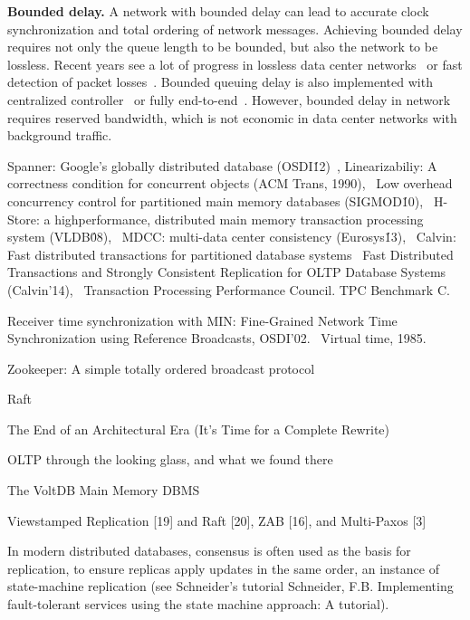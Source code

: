\textbf{Bounded delay.}
A network with bounded delay can lead to accurate clock synchronization and total ordering of network messages.
Achieving bounded delay requires not only the queue length to be bounded, but also the network to be lossless.
Recent years see a lot of progress in lossless data center networks~\cite{calder2013don,cheng2014catch,handley2017re} or fast detection of packet losses~\cite{li2016lossradar}.
Bounded queuing delay is also implemented with centralized controller~\cite{perry2015fastpass} or fully end-to-end~\cite{cho2017credit}.
However, bounded delay in network requires reserved bandwidth, which is not economic in data center networks with background traffic.





\iffalse


Spanner: Google’s globally distributed database (OSDI\'12)~\cite{corbett2013spanner},
Linearizabiliy: A correctness condition for concurrent objects (ACM Trans, 1990),~\cite{herlihy1990linearizability}
Low overhead concurrency control for partitioned main memory databases (SIGMOD\'10),~\cite{jones2010low}
H-Store: a highperformance,
distributed main memory transaction processing
system (VLDB\'08),~\cite{kallman2008h}
MDCC: multi-data center consistency (Eurosys\'13),~\cite{kraska2013mdcc}
Calvin: Fast distributed transactions for
partitioned database systems~\cite{thomson2012calvin}
Fast Distributed Transactions and Strongly Consistent Replication
for OLTP Database Systems (Calvin'14),~\cite{thomson2014fast}
Transaction Processing Performance Council. TPC
Benchmark C.~\cite{council2005transaction}

Receiver time synchronization with MIN:
Fine-Grained Network Time Synchronization using Reference
Broadcasts, OSDI'02.~\cite{elson2002fine}
Virtual time, 1985.~\cite{jefferson1985virtual}


Zookeeper: A simple totally ordered broadcast protocol

Raft

The End of an Architectural Era
(It’s Time for a Complete Rewrite)

OLTP through the looking glass, and what we found there

The VoltDB Main Memory DBMS

Viewstamped Replication [19] and Raft [20], ZAB [16], and Multi-Paxos [3]

In modern distributed databases, consensus is often used as the basis for replication, to ensure replicas apply updates in the same order, an instance of state-machine replication (see Schneider’s tutorial Schneider, F.B. Implementing fault-tolerant services using the state machine approach: A tutorial).

